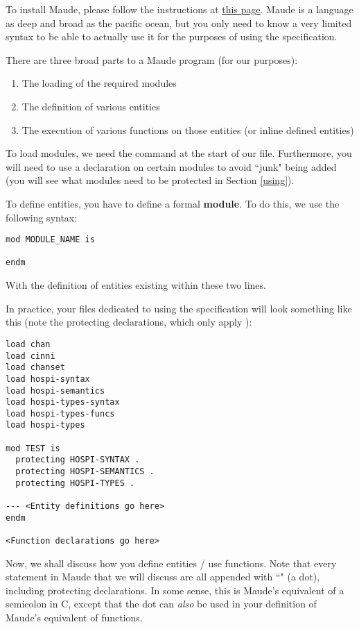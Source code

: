 To install Maude, please follow the instructions at \href{http://maude.cs.illinois.edu/w/index.php/Maude_download_and_installation}{this page}.
Maude is a language as deep and broad as the pacific ocean, but you only need to know a very limited syntax to be able to actually use it for the purposes of using the specification.

There are three broad parts to a Maude program (for our purposes):
\begin{enumerate}
    \item The loading of the required modules
    \item The definition of various entities 
    \item The execution of various functions on those entities (or inline defined entities)
\end{enumerate}

To load modules, we need the  command at the start of our file. Furthermore, you will need to use a  declaration on certain modules to avoid ``junk" being added (you will see what modules need to be protected in Section \ref{using}).

To define entities, you have to define a formal \textbf{module}. To do this, we use the following syntax:

\begin{verbatim}
mod MODULE_NAME is

endm
\end{verbatim}
With the definition of entities existing within these two lines.

In practice, your files dedicated to using the specification will look something like this (note the protecting declarations, which only apply ):
\begin{verbatim}
load chan
load cinni
load chanset
load hospi-syntax
load hospi-semantics
load hospi-types-syntax
load hospi-types-funcs
load hospi-types

mod TEST is
  protecting HOSPI-SYNTAX .
  protecting HOSPI-SEMANTICS .
  protecting HOSPI-TYPES .

--- <Entity definitions go here>
endm

<Function declarations go here>

\end{verbatim}

Now, we shall discuss how you define entities / use functions. Note that every statement in Maude that we will discuss are all appended with ``" (a dot), including protecting declarations. In some sense, this is Maude's equivalent of a semicolon in C, except that the dot can \textit{also} be used in your definition of Maude's equivalent of functions.

